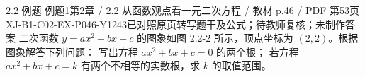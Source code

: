 \par\noindent\begin{minipage}{\linewidth}
\begin{bankitem}{2.2 例题 例题1}{第2章 / 2.2 从函数观点看一元二次方程 / 教材 p.46 / PDF 第53页}{XJ-B1-C02-EX-P046-Y1243}{已对照原页转写题干及公式；待教师复核；未制作答案}
二次函数 $y=ax^2+bx+c$ 的图象如图 2.2-2 所示，顶点坐标为 $(2,2)$。根据图象解答下列问题：
写出方程 $ax^2+bx+c=0$ 的两个根；
若方程 $ax^2+bx+c=k$ 有两个不相等的实数根，求 $k$ 的取值范围。
\end{bankitem}
\end{minipage}\par\medskip
